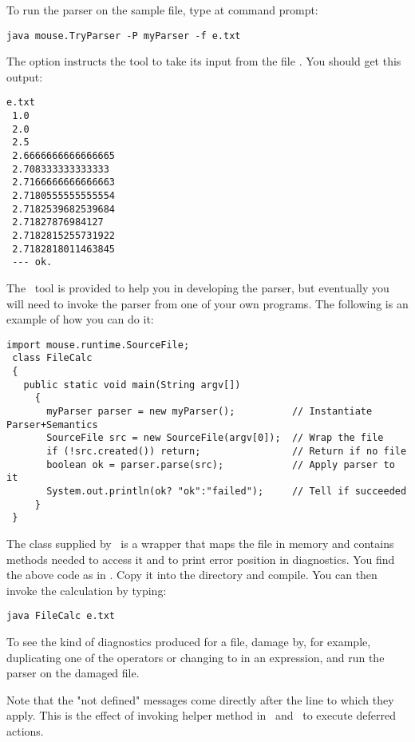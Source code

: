 To run the parser on the sample file, type at command prompt:

\small
\begin{Verbatim}[samepage=true,xleftmargin=15mm,baselinestretch=0.8]
 java mouse.TryParser -P myParser -f e.txt
\end{Verbatim}
\normalsize

The option  instructs the tool to take its input from
the file .
You should get this output:

\small
\begin{Verbatim}[samepage=true,xleftmargin=15mm,baselinestretch=0.8]
 e.txt
 1.0
 2.0
 2.5
 2.6666666666666665
 2.708333333333333
 2.7166666666666663
 2.7180555555555554
 2.7182539682539684
 2.71827876984127
 2.7182815255731922
 2.7182818011463845
 --- ok.
\end{Verbatim}
\normalsize

The \Mouse\ tool  is provided to help you in developing the parser,
but eventually you will need to invoke the parser from one of your own programs.
The following is an example of how you can do it:

\medskip
\small
\begin{Verbatim}[frame=single,framesep=2mm,samepage=true,xleftmargin=6mm,xrightmargin=6mm,baselinestretch=0.8]
 import mouse.runtime.SourceFile;
 class FileCalc
 {
   public static void main(String argv[])
     {
       myParser parser = new myParser();          // Instantiate Parser+Semantics
       SourceFile src = new SourceFile(argv[0]);  // Wrap the file
       if (!src.created()) return;                // Return if no file
       boolean ok = parser.parse(src);            // Apply parser to it
       System.out.println(ok? "ok":"failed");     // Tell if succeeded
     }
 }
\end{Verbatim}
\normalsize

The class  supplied by \Mouse\ is a wrapper
that maps the file in memory 
and contains methods needed to access it and to
print error position in diagnostics.
You find the above code as  in .
Copy it into the  directory and compile.
You can then invoke the calculation by typing:

\small
\begin{Verbatim}[samepage=true,xleftmargin=15mm,baselinestretch=0.8]
 java FileCalc e.txt
\end{Verbatim}
\normalsize

To see the kind of diagnostics produced for a file, damage 
by, for example, duplicating one of the operators 
or changing  to  in an expression,
and run the parser on the damaged file.

Note that the "not defined" messages come directly after the line
to which they apply.
This is the effect of invoking helper method 
in \Printa\ and \Storea\ to execute deferred actions.

